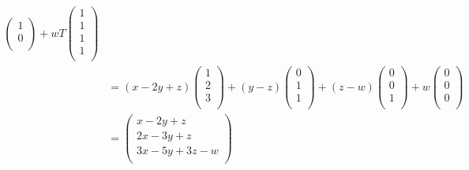 \documentclass{eh-homework}
\begin{document}
\begin{question}{3}
\begin{align*}
\begin{pmatrix}
                1 \\
                0 \\
            \end{pmatrix}
            +wT\begin{pmatrix}
                1 \\
                1 \\
                1 \\
                1 \\
           \end{pmatrix} \\
           &=
           (x - 2y + z)
           \begin{pmatrix}
             1 \\
             2 \\
             3 \\
           \end{pmatrix}
           +(y-z)
           \begin{pmatrix}
             0 \\
             1 \\
             1 \\
           \end{pmatrix}
           +(z-w)
           \begin{pmatrix}
             0 \\
             0 \\
             1 \\
           \end{pmatrix}
           +w
           \begin{pmatrix}
             0 \\
             0 \\
             0 \\
           \end{pmatrix} \\
           &=\begin{pmatrix}
             x - 2y + z \\
             2x -3y + z \\
             3x - 5y + 3z - w \\
           \end{pmatrix}
        \end{align*}
    \end{question}
    \newpage
\end{document}
